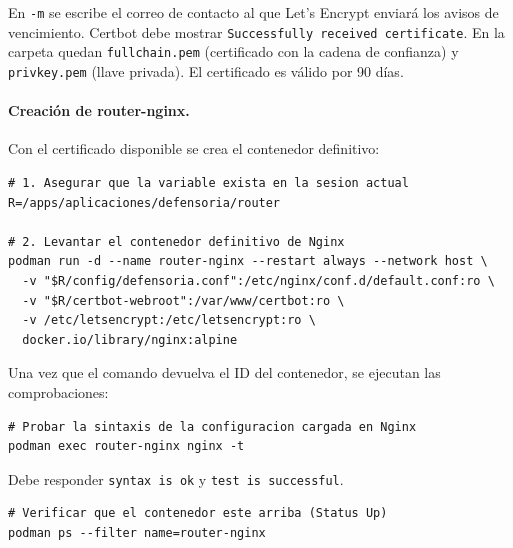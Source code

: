 En \texttt{-m} se escribe el correo de contacto al que Let's Encrypt enviará los avisos de vencimiento. Certbot debe mostrar \texttt{Successfully received certificate}. En la carpeta quedan \texttt{fullchain.pem} (certificado con la cadena de confianza) y \texttt{privkey.pem} (llave privada). El certificado es válido por 90 días.

\paragraph{Creación de router-nginx.} Con el certificado disponible se crea el contenedor definitivo:
\begin{lstlisting}
# 1. Asegurar que la variable exista en la sesion actual
R=/apps/aplicaciones/defensoria/router

# 2. Levantar el contenedor definitivo de Nginx
podman run -d --name router-nginx --restart always --network host \
  -v "$R/config/defensoria.conf":/etc/nginx/conf.d/default.conf:ro \
  -v "$R/certbot-webroot":/var/www/certbot:ro \
  -v /etc/letsencrypt:/etc/letsencrypt:ro \
  docker.io/library/nginx:alpine
\end{lstlisting}
Una vez que el comando devuelva el ID del contenedor, se ejecutan las comprobaciones:
\begin{lstlisting}
# Probar la sintaxis de la configuracion cargada en Nginx
podman exec router-nginx nginx -t
\end{lstlisting}
Debe responder \texttt{syntax is ok} y \texttt{test is successful}.
\begin{lstlisting}
# Verificar que el contenedor este arriba (Status Up)
podman ps --filter name=router-nginx
\end{lstlisting}

